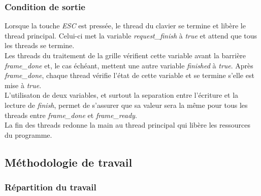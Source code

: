 \documentclass[11pt, a4paper]{article}
\begin{document}
\subsubsection{Condition de sortie}

Lorsque la touche \textit{ESC} est pressée, le thread du clavier se termine et libère le thread principal. Celui-ci met la variable \textit{request\_finish} à \textit{true} et attend que tous les threads se termine. \\

Les threads du traitement de la grille vérifient cette variable avant la barrière \textit{frame\_done} et, le cas échéant, mettent une autre variable \textit{finished} à \textit{true}. Après \textit{frame\_done}, chaque thread vérifie l'état de cette variable et se termine s'elle est mise à \textit{true}. \\

L'utilisaton de deux variables, et surtout la separation entre l'écriture et la lecture de \textit{finish}, permet de s'assurer que sa valeur sera la même pour tous les threads entre \textit{frame\_done} et \textit{frame\_ready}. \\

La fin des threads redonne la main au thread principal qui libère les ressources du programme.

\newpage

\subsection{Méthodologie de travail}
\subsubsection{Répartition du travail}

\newpage
\end{document}
